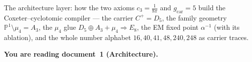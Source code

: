 
\maketitle
\vspace{-0.4cm}

\begin{keybox}
The architecture layer: how the two axioms $c_3=\tfrac1{8\pi}$ and $g_{\mathrm{car}}=5$ build the
Coxeter--cyclotomic compiler --- the carrier $C^+{=}D_5$, the family geometry $\mathbb P^1\setminus\mu_4{=}A_3$,
the $\mu_4$ glue $D_5\oplus A_3+\mu_4\Rightarrow E_8$, the EM fixed point $\alpha^{-1}$ (with its ablation),
and the whole number alphabet $16,40,41,48,240,248$ as carrier traces.
\end{keybox}


\noindent\textbf{You are reading \textbf{document~1} (Architecture).}


\TFPTbadges
\TFPTclaimstack[compiler]


\tableofcontents
\clearpage
